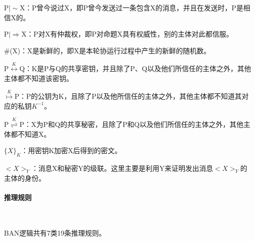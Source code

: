 \documentclass[cs4size,a4pape,UTF8]{ctexart}
\numberwithin{equation}{section}
\numberwithin{table}{section}
\numberwithin{figure}{section}
\begin{document}
P$\lvert\sim$X：P曾今说过X，即P曾今发送过一条包含X的消息，并且在发送时，P是相信X的。

P$\lvert\Rightarrow$X：P对X有仲裁权，即P对命题X具有权威性，别的主体对此都信服。

\#(X)：X是新鲜的，即X是本轮协运行过程中产生的新鲜的随机数。

P$\stackrel{K}{\longleftrightarrow}$Q：K是P与Q的共享密钥，并且除了P、Q以及他们所信任的主体之外，其他主体都不知道该密钥。

$\stackrel{K}{\mapsto}$P：P的公钥为K，且除了P以及他所信任的主体之外，其他主体都不知道其对应的私钥$K^{-1}$。

P$\stackrel{K}{\rightleftharpoons}$P：X为P和Q的共享秘密，且除了P和Q以及他们所信任的主体之外，其他主体都不知道X。

$\{X\}_{K}$：用密钥K加密X后得到的密文。

$<X>_{Y}$：消息X和秘密Y的级联。这里主要是利用Y来证明发出消息$<X>_{Y}$的主体的身份。

\paragraph{推理规则}\

BAN逻辑共有7类19条推理规则。
\end{document}
